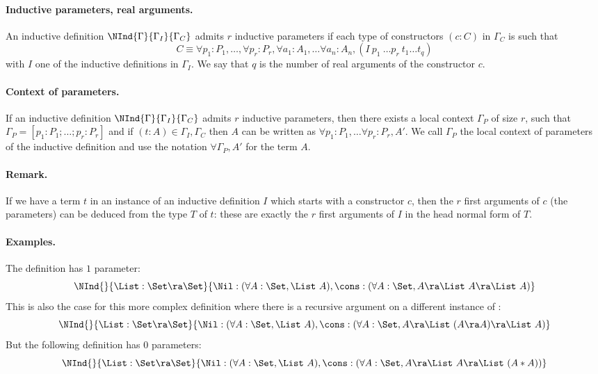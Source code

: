 \paragraph{Inductive parameters, real arguments.}
An inductive definition $\NInd{\Gamma}{\Gamma_I}{\Gamma_C}$ admits 
$r$ inductive parameters if each type of constructors $(c:C)$ in
$\Gamma_C$ is such that 
\[C\equiv \forall
p_1:P_1,\ldots,\forall p_r:P_r,\forall a_1:A_1, \ldots \forall a_n:A_n,
(I~p_1~\ldots p_r~t_1\ldots t_q)\]
with $I$ one of the inductive definitions in $\Gamma_I$. 
We say that $q$ is the number of real arguments of the constructor
$c$. 
\paragraph{Context of parameters.}
If an inductive definition $\NInd{\Gamma}{\Gamma_I}{\Gamma_C}$ admits 
$r$ inductive parameters, then there exists a local context $\Gamma_P$ of
size $r$, such that $\Gamma_P=[p_1:P_1;\ldots;p_r:P_r]$ and 
if $(t:A) \in \Gamma_I,\Gamma_C$ then $A$ can be written as 
$\forall p_1:P_1,\ldots \forall p_r:P_r,A'$. 
We call $\Gamma_P$ the local context of parameters of the inductive
definition and use the notation $\forall \Gamma_P,A'$ for the term $A$.
\paragraph{Remark.}
If we have a term $t$ in an instance of an
inductive definition $I$ which starts with a constructor $c$, then the
$r$ first arguments of $c$ (the parameters) can be deduced from the
type $T$ of $t$: these are exactly the $r$ first arguments of $I$ in
the head normal form of $T$.
\paragraph{Examples.}
The \List{} definition has $1$ parameter:
\[\NInd{}{\List:\Set\ra\Set}{\Nil:(\forall A:\Set, \List~A),
  \cons : (\forall A:\Set, A \ra \List~A \ra \List~A)}\]
This is also the case for this more complex definition where there is
a recursive argument on a different instance of \List: 
\[\NInd{}{\List:\Set\ra\Set}{\Nil:(\forall A:\Set, \List~A),
  \cons : (\forall A:\Set, A \ra \List~(A \ra A) \ra \List~A)}\]
But the following definition has $0$ parameters:
\[\NInd{}{\List:\Set\ra\Set}{\Nil:(\forall A:\Set, \List~A),
  \cons : (\forall A:\Set, A \ra \List~A \ra \List~(A*A))}\]

